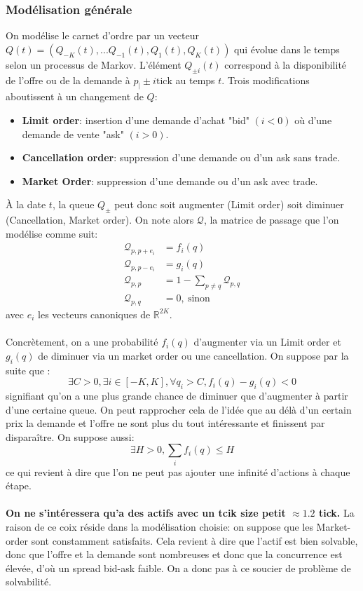 \documentclass[12pt,a4paper]{article}
\theoremstyle{definition}
\theoremstyle{remark}
\begin{document}
    \subsubsection {Modélisation générale}
    On modélise le carnet d'ordre par un vecteur $Q(t) = (Q_{-K}(t),...Q_{-1}(t),Q_{1}(t),Q_K(t))$ qui évolue dans le temps selon un processus de Markov. L'élément $Q_{\pm i}(t)$ correspond à la disponibilité de l'offre ou de la demande à $p_{\mid}\pm i\text{tick}$ au temps $t$.
    Trois modifications aboutissent à un changement de $Q$:
    \begin{itemize}
        \item \textbf{Limit order}: insertion d'une demande d'achat "bid" $(i<0)$ où d'une demande de vente "ask" $(i>0)$.
        \item \textbf{Cancellation order}: suppression d'une demande ou d'un ask sans trade.
        \item \textbf{Market Order}: suppression d'une demande ou d'un ask avec trade.
    \end{itemize}
    À la date $t$, la queue $Q_{\pm}$ peut donc soit augmenter (Limit order) soit diminuer (Cancellation, Market order).
    On note alors $\mathcal Q$, la matrice de passage que l'on modélise comme suit:
    $$\begin{aligned}
    \mathcal Q_{p,p+e_i} &= f_i(q) \\
    \mathcal Q_{p,p-e_i} &= g_i(q) \\
    \mathcal Q_{p,p} &= 1 - \sum_{p \neq q} \mathcal Q_{p,q} \\
    \mathcal Q_{p,q} &= 0, \ \text{sinon}
    \end{aligned}$$
    avec $e_i$ les vecteurs canoniques de $\mathbb{R}^{2K}$.
    \\
    \\
    Concrètement, on a une probabilité $f_i(q)$ d'augmenter via un Limit order et $g_i(q)$ de diminuer via un market order ou une cancellation. On suppose par la suite que :
    $$\exists C>0, \exists i\in [-K,K], \forall q_i>C, f_i(q)-g_i(q)<0$$ signifiant qu'on a une plus grande chance de diminuer que d'augmenter à partir d'une certaine queue. On peut rapprocher cela de l'idée que au délà d'un certain prix la demande et l'offre ne sont plus du tout intéressante et finissent par disparaître. On suppose aussi:$$\exists H>0, \sum_if_i(q)\leq H$$ ce qui revient à dire que l'on ne peut pas ajouter une infinité d'actions à chaque étape.
    \\
    \\
    \textbf{On ne s’intéressera qu'a des actifs avec un tcik size petit $\approx 1.2$ tick.} La raison de ce coix réside dans la modélisation choisie: on suppose que les Market-order sont constamment satisfaits. Cela revient à dire que l'actif est bien solvable, donc que l'offre et la demande sont nombreuses et donc que la concurrence est élevée, d'où un spread bid-ask faible. On a donc pas à ce soucier de problème de solvabilité.
\end{document}
